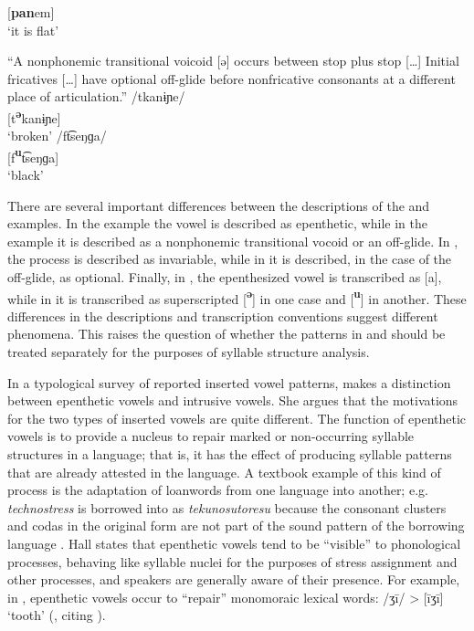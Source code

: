 [\textbf{pan}em]\\
\glt ‘it is flat’
\citep[35--36]{Dol2007}
\z

\ea\label{ex:3.9}

“A nonphonemic transitional voicoid [ə] occurs between stop plus stop […] Initial fricatives […] have optional off-glide before nonfricative consonants at a different place of articulation.” 
\ea   /tkanɨɲe/\\{}
  [t\textbf{\textsuperscript{ə}}kanɨɲe]\\
\glt  ‘broken’
\ex   /ft͡seŋɡa/\\{}
  [f\textbf{\textsuperscript{u}}t͡seŋɡa]\\
\glt  ‘black’
\citep[81]{Howard1967}
\z
\z

  There are several important differences between the descriptions of the  and  examples. In the  example the vowel is described as epenthetic, while in the  example it is described as a nonphonemic transitional vocoid or an off-glide. In , the process is described as invariable, while in  it is described, in the case of the off-glide, as optional. Finally, in , the epenthesized vowel is transcribed as [a], while in  it is transcribed as superscripted [\textbf{\textsuperscript{ə}}] in one case and [\textbf{\textsuperscript{u}}] in another. These differences in the descriptions and transcription conventions suggest different phenomena. This raises the question of whether the patterns in  and  should be treated separately for the purposes of syllable structure analysis.

  In a typological survey of reported inserted vowel patterns, \citet{Hall2006} makes a distinction between epenthetic vowels and intrusive vowels. She argues that the motivations for the two types of inserted vowels are quite different. The function of epenthetic vowels is to provide a nucleus to repair marked or non-occurring syllable structures in a language; that is, it has the effect of producing syllable patterns that are already attested in the language. A textbook example of this kind of process is the adaptation of loanwords from one language into another; e.g.  \textit{technostress} is borrowed into  as \textit{tekunosutoresu} because the consonant clusters and codas in the original form are not part of the sound pattern of the borrowing language \citep[69]{Kay1995}. Hall states that epenthetic vowels tend to be ``visible'' to phonological processes, behaving like syllable nuclei for the purposes of stress assignment and other processes, and speakers are generally aware of their presence. For example, in , epenthetic vowels occur to ``repair'' monomoraic lexical words: /ʒī/ > [īʒī] ‘tooth’ (\citealt[6]{Hall2006}, citing \citealt{Olson2003}).

